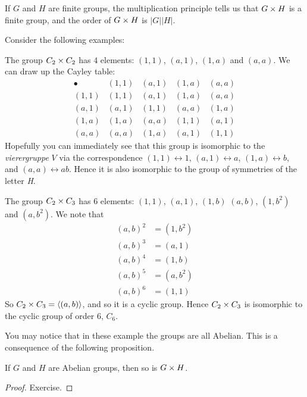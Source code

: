 If $G$ and $H$ are finite groups, the multiplication principle tells us
that $G \times H$ is a finite group, and the order of $G \times H$ is
$|G||H|$.

Consider the following examples:

\begin{example}
  The group $C_{2} \times C_{2}$ has $4$ elements: $(1,1)$, $(a,1)$, $(1,a)$
  and $(a,a)$.  We can draw up the Cayley table:
  \[
    \begin{array}{c|cccc}
      \bullet & (1,1) & (a,1) & (1,a) & (a,a) \\
      \hline
        (1,1) & (1,1) & (a,1) & (1,a) & (a,a) \\
        (a,1) & (a,1) & (1,1) & (a,a) & (1,a) \\
        (1,a) & (1,a) & (a,a) & (1,1) & (a,1) \\
        (a,a) & (a,a) & (1,a) & (a,1) & (1,1)
    \end{array}
  \]
  Hopefully you can immediately see that this group is isomorphic to the
  {\it vierergruppe} $V$ via the correspondence
  $(1,1) \leftrightarrow 1$, $(a,1) \leftrightarrow a$, $(1,a) \leftrightarrow b$, 
  and $(a,a) \leftrightarrow ab$.  Hence it is also isomorphic to the
  group of symmetries of the letter \textsl{H}.
\end{example}

\begin{example}
  The group $C_{2} \times C_{3}$ has $6$ elements: $(1,1)$, $(a,1)$, $(1,b)$
  $(a,b)$, $(1, b^{2})$ and $(a,b^{2})$.  We note that
  \begin{align*}
    (a,b)^{2} &= (1,b^{2})\\
    (a,b)^{3} &= (a,1)\\
    (a,b)^{4} &= (1,b)\\
    (a,b)^{5} &= (a,b^{2})\\
    (a,b)^{6} &= (1,1)
  \end{align*}
  So $C_{2} \times C_{3} = \langle (a,b) \rangle$, and so it is a cyclic group.
  Hence $C_{2} \times C_{3}$ is isomorphic to the cyclic group of order $6$,
  $C_{6}$.
\end{example}

You may notice that in these example the groups are all Abelian.  This is a
consequence of the following proposition.

\begin{proposition}
  If $G$ and $H$ are Abelian groups, then so is $G \times H$.
\end{proposition}
\begin{proof}
  Exercise.
\end{proof}

